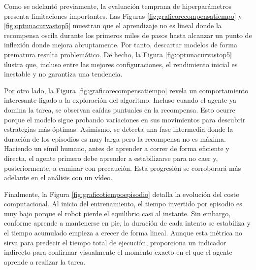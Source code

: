 \documentclass[11pt,a4paper]{article}
\begin{document}
	Como se adelantó previamente, la evaluación temprana de hiperparámetros presenta limitaciones importantes. Las Figuras \ref{fig:graficorecompensatiempo} y \ref{fig:optunacurvastop5} muestran que el aprendizaje no es lineal donde la recompensa oscila durante los primeros miles de pasos hasta alcanzar un punto de inflexión donde mejora abruptamente. Por tanto, descartar modelos de forma prematura resulta problemático. De hecho, la Figura \ref{fig:optunacurvastop5} ilustra que, incluso entre las mejores configuraciones, el rendimiento inicial es inestable y no garantiza una tendencia.
	\newline
	
	Por otro lado, la Figura \ref{fig:graficorecompensatiempo} revela un comportamiento interesante ligado a la exploración del algoritmo. Incluso cuando el agente ya domina la tarea, se observan caídas puntuales en la recompensa. Esto ocurre porque el modelo sigue probando variaciones en sus movimientos para descubrir estrategias más óptimas. Asimismo, se detecta una fase intermedia donde la duración de los episodios es muy larga pero la recompensa no es máxima. Haciendo un símil humano, antes de aprender a correr de forma eficiente y directa, el agente primero debe aprender a estabilizarse para no caer y, posteriormente, a caminar con precaución. Esta progresión se corroborará más adelante en el análisis con un vídeo.
	\newline
	
	Finalmente, la Figura \ref{fig:graficotiempoepisodio} detalla la evolución del coste computacional. Al inicio del entrenamiento, el tiempo invertido por episodio es muy bajo porque el robot pierde el equilibrio casi al instante. Sin embargo, conforme aprende a mantenerse en pie, la duración de cada intento se estabiliza y el tiempo acumulado empieza a crecer de forma lineal. Aunque esta métrica no sirva para predecir el tiempo total de ejecución, proporciona un indicador indirecto para confirmar visualmente el momento exacto en el que el agente aprende a realizar la tarea.
\end{document}
